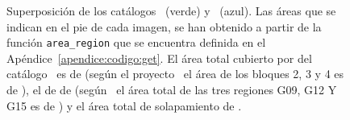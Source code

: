 \begin{figure}[H]
\begin{center}
  \end{center}
  \caption{\small Superposición de los catálogos \gama\ (verde) y \hatlas\ (azul). Las áreas que se indican en el pie de cada imagen, se han obtenido a partir de la función \texttt{area\_region} que se encuentra definida en el Apéndice~\ref{apendice:codigo:get}. El área total cubierto por del catálogo \hatlas\ es de  (según el proyecto \hatlas\ el área de los bloques 2, 3 y 4 es de ), el de \gama de  (según \gama\ el área total de las tres regiones G09, G12 Y G15 es de ) y el área total de solapamiento de .}
  \label{fig:superposicion}
\end{figure}